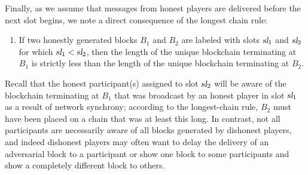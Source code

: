    Finally, as we assume that messages from honest players are
    delivered before the next slot begins, we note a direct consequence of the longest
    chain rule:
  \begin{enumerate}[label={\textbf{A\arabic*}}., ref={\textbf{A\arabic*}}, resume=axiom]
    \item\label{axiom:honest-depth} 
    If two honestly generated blocks $B_1$ and $B_2$ are labeled
    with slots $\textsl{sl}_1$ and $\textsl{sl}_2$ for which $\textsl{sl}_1 < \textsl{sl}_2$,
    then the length of the unique blockchain terminating at $B_1$ is
    strictly less than the length of the unique blockchain terminating at $B_2$.
  \end{enumerate}
  Recall that the honest participant(s) assigned to slot
  $\textsl{sl}_2$ will be aware of the blockchain terminating at $B_1$ that
  was broadcast by an honest player in slot $\textsl{sl}_1$ as a result of
  network synchrony; according to the longest-chain rule, 
  $B_2$ must have been placed on a chain that was at least this long. In contrast, not
  all participants are necessarily aware of all blocks generated by
  dishonest players, and indeed dishonest players may often want to
  delay the delivery of an adversarial block to a participant or show
  one block to some participants and show a completely different block
  to others.




